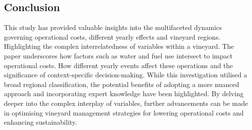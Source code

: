 \documentclass[review,12pt,authoryear]{elsarticle}
\begin{document}
\begin{linenumbers}
\fi

\section{Conclusion}

This study has provided valuable insights into the multifaceted dynamics governing operational costs, different yearly effects and vineyard regions. Highlighting the complex interrelatedness of variables within a vineyard. The paper underscores how factors such as water and fuel use intersect to impact operational costs. How different yearly events affect these operations and the significance of context-specific decision-making. While this investigation utilised a broad regional classification, the potential benefits of adopting a more nuanced approach and incorporating expert knowledge have been highlighted. By delving deeper into the complex interplay of variables, further advancements can be made in optimising vineyard management strategies for lowering operational costs and enhancing sustainability.








 \appendix

\end{linenumbers}
 
\end{document}
